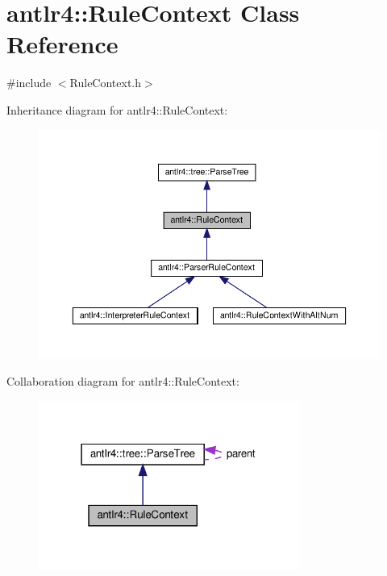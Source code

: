 \hypertarget{classantlr4_1_1RuleContext}{}\section{antlr4\+:\+:Rule\+Context Class Reference}
\label{classantlr4_1_1RuleContext}


{\ttfamily \#include $<$Rule\+Context.\+h$>$}



Inheritance diagram for antlr4\+:\+:Rule\+Context\+:
\nopagebreak
\begin{figure}[H]
\begin{center}
\leavevmode
\includegraphics[width=350pt]{classantlr4_1_1RuleContext__inherit__graph}
\end{center}
\end{figure}


Collaboration diagram for antlr4\+:\+:Rule\+Context\+:
\nopagebreak
\begin{figure}[H]
\begin{center}
\leavevmode
\includegraphics[width=243pt]{classantlr4_1_1RuleContext__coll__graph}
\end{center}
\end{figure}
